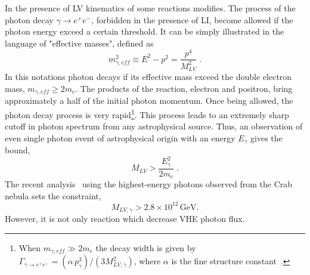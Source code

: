 \documentclass[12pt]{article}
\begin{document}
In the presence of LV kinematics of some reactions modifies.  The process of the photon decay 
$\gamma \to e^+e^-$, forbidden in the presence of LI, become allowed if the photon energy exceed a certain threshold. It can be simply illustrated in the language of "effective masses", defined as 
\begin{equation}
\label{mgamma}
m^2_{\gamma,eff} \equiv E^2-p^2=\frac{p^4}{M_{LV}^2}\;.
\end{equation}
In this notations photon decays if its effective mass exceed the double electron mass, $m_{\gamma,eff} \geq 2m_e$. The products of the reaction, electron and positron, bring approximately a half of the initial photon momentum. Once being allowed, the photon decay process is
very rapid\footnote{When $m_{\gamma,eff}\gg 2m_e$ the decay width is given
by
$\Gamma_{\gamma\to e^+e^-}=(\alpha\, p_\gamma^3)/(3 M_{LV,\gamma}^2)$,
where $\alpha$ is the fine structure constant~\cite{Rubtsov:2012kb}.}. 
This process leads to an extremely sharp cutoff in photon spectrum from any
astrophysical source. Thus, an observation of even single 
photon event of astrophysical origin with an energy $E_\gamma$ gives the
bound,
\begin{equation}
\label{photondecaybound}
M_{LV} > \frac{E_\gamma^2}{2m_e}\;.
\end{equation}
The recent analysis~\cite{Martinez-Huerta:2016azo} 
using the highest-energy photons observed from
the Crab nebula sets the constraint,
\begin{equation}
\label{decayrecent}
M_{LV,\gamma} > 2.8\times 10^{12}\,\mbox{GeV}.
\end{equation}
However, it is not only reaction which decrease VHE photon flux. 

\end{document}
